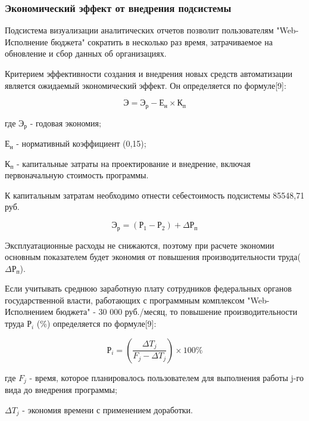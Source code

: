 \documentclass[a4paper]{extarticle}
\numberwithin{equation}{section}
\begin{document}
\subsubsection{Экономический эффект от внедрения подсистемы}
Подсистема визуализации аналитических отчетов позволит пользователям "Web-Исполнение бюджета" сократить в несколько раз время, затрачиваемое на обновление и сбор данных об организациях.\par
Критерием эффективности создания и внедрения новых средств автоматизации является ожидаемый экономический эффект. Он определяется по формуле[9]:\par
\begin{equation}
\label{form19}
	\text{Э}=\text{Э}_\text{р}-\text{Е}_\text{н}\times \text{К}_\text{п}
\end{equation}\par
где $\text{Э}_\text{р}$ - годовая экономия;\par
$\text{Е}_\text{н}$ - нормативный коэффициент (0,15);\par
$\text{К}_\text{п}$ - капитальные затраты на проектирование и внедрение, включая первоначальную стоимость программы.\par
К капитальным затратам необходимо отнести себестоимость подсистемы 85548,71 руб.\par
\begin{equation}
\label{form20}
	\text{Э}_\text{р}=(\text{Р}_\text{1}-\text{Р}_\text{2})+\Delta\text{Р}_\text{п}
\end{equation}\par
Эксплуатационные расходы не снижаются, поэтому при расчете экономии основным показателем будет экономия от повышения производительности труда($\Delta\text{Р}_\text{п}$).\par
Если учитывать среднюю заработную плату сотрудников федеральных органов государственной власти, работающих с программным комплексом "Web-Исполнением бюджета" - 30 000 руб./месяц, то повышение производительности труда $\text{Р}_i$ (\%) определяется по формуле[9]:\par
\begin{equation}
\label{form21}
	\text{Р}_i=(\frac{\Delta T_j}{F_j-\Delta T_j})\times 100\%
\end{equation}\par
где $F_j$ - время, которое планировалось пользователем для выполнения работы j-го вида до внедрения программы;\par
$\Delta T_j$ - экономия времени с применением доработки.\par
\end{document}
